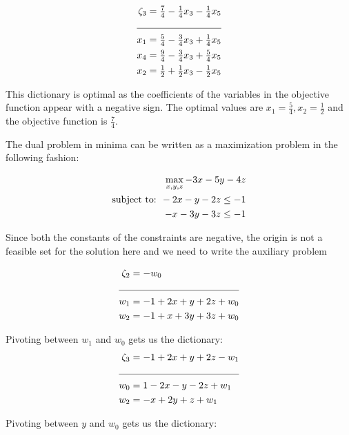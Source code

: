 \documentclass[letterpaper,12pt]{article}
\theoremstyle{definition}
\begin{document}
\begin{align*}
  \zeta_3 &= \tfrac{7}{4} - \tfrac{1}{4}x_3-\tfrac{1}{4}x_5\\
  \cline{1-2}
  x_1 &= \tfrac{5}{4} - \tfrac{3}{4}x_3+\tfrac{1}{4}x_5\\
  x_4 &= \tfrac{9}{4} - \tfrac{3}{4}x_3+\tfrac{5}{4}x_5\\
  x_2 &=\tfrac{1}{2}+\tfrac{1}{2}x_3-\tfrac{1}{2}x_5\\
\end{align*}
\begin{flushleft}
This dictionary is optimal as the coefficients of the variables in the objective function appear with a
negative sign. The optimal values are $x_1=\frac{5}{4}, x_2 = \frac{1}{2}$ and the objective function is $\frac{7}{4}$.
\end{flushleft}

\vspace{3mm}
\begin{flushleft}
The dual problem in minima can be written as a maximization problem in the following fashion:
\end{flushleft}

\begin{align*}
  \max_{{x,y,z}} -3x-5y-4z\\
  \textnormal{subject to: } -2x-y-2z\leq -1\\
   -x-3y-3z\leq -1\\
\end{align*}

Since both the constants of the constraints are negative, the origin is not a feasible set for the solution here and we need to write the auxiliary problem

\begin{align*}
\zeta_2 & =-w_0\\
\cline{1-2}
w_1 &=-1+2x+y+2z+w_0\\
w_2 &=-1+x+3y+3z+w_0\\
\end{align*}

Pivoting between $w_1$ and $w_0$ gets us the dictionary:
\begin{align*}
\zeta_3 &=-1+2x+y+2z-w_1\\
\cline{1-2}
w_0 &=1-2x-y-2z+w_1\\
w_2 &=-x+2y+z+w_1\\
\end{align*}

Pivoting between $y$ and $w_0$ gets us the dictionary:
\end{document}
